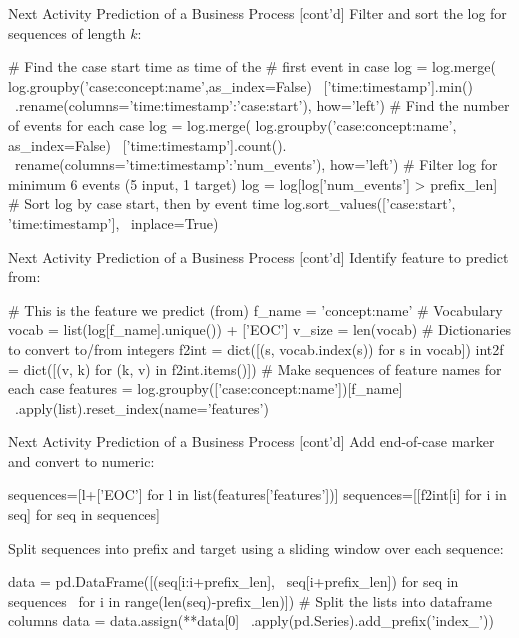 \documentclass[ignorenonframetext,xcolor=x11names]{beamer}
\begin{document}
\begin{frame}[fragile]{Next Activity Prediction of a Business Process \small [cont'd]}
Filter and sort the log for sequences of length $k$:
\begin{pythoncode}
# Find the case start time as time of the 
# first event in case
log = log.merge( 
    log.groupby('case:concept:name',as_index=False) \
    ['time:timestamp'].min() \
    .rename(columns={'time:timestamp':'case:start'}), 
    how='left')
# Find the number of events for each case
log = log.merge( 
    log.groupby('case:concept:name', as_index=False) \
    ['time:timestamp'].count(). \
    rename(columns={'time:timestamp':'num_events'}), 
    how='left')
# Filter log for minimum 6 events (5 input, 1 target)
log = log[log['num_events'] > prefix_len]
# Sort log by case start, then by event time
log.sort_values(['case:start', 'time:timestamp'], \
    inplace=True)
\end{pythoncode}
\end{frame}


\begin{frame}[fragile]{Next Activity Prediction of a Business Process \small [cont'd]}
Identify feature to predict from:
\begin{pythoncode}
# This is the feature we predict (from)
f_name = 'concept:name'
# Vocabulary
vocab = list(log[f_name].unique()) + ['EOC']
v_size = len(vocab)
# Dictionaries to convert to/from integers
f2int = dict([(s, vocab.index(s)) for s in vocab])
int2f = dict([(v, k) for (k, v) in f2int.items()])
# Make sequences of feature names for each case
features = log.groupby(['case:concept:name'])[f_name] \
    .apply(list).reset_index(name='features')
\end{pythoncode}
\end{frame}


\begin{frame}[fragile]{Next Activity Prediction of a Business Process \small [cont'd]}
Add end-of-case marker and convert to numeric:
\begin{pythoncode}
sequences=[l+['EOC'] for l in list(features['features'])]
sequences=[[f2int[i] for i in seq] for seq in sequences]
\end{pythoncode}
Split sequences into prefix and target using a sliding window over each sequence:
\begin{pythoncode}
data = pd.DataFrame([(seq[i:i+prefix_len], \
    seq[i+prefix_len]) for seq in sequences \
    for i in range(len(seq)-prefix_len)])
# Split the lists into dataframe columns
data = data.assign(**data[0] \
    .apply(pd.Series).add_prefix('index_'))
\end{pythoncode}
\end{frame}
\end{document}
